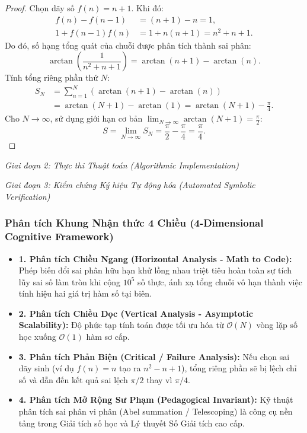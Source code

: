 \documentclass{article}
\begin{document}
\begin{proof}
Chọn dãy số $f(n) = n + 1$. Khi đó:
\begin{align}
    f(n) - f(n-1) &= (n + 1) - n = 1, \\
    1 + f(n-1) f(n) &= 1 + n(n + 1) = n^2 + n + 1.
\end{align}
Do đó, số hạng tổng quát của chuỗi được phân tích thành sai phân:
\begin{equation}
    \arctan\left(\frac{1}{n^2 + n + 1}\right) = \arctan(n + 1) - \arctan(n).
\end{equation}
Tính tổng riêng phần thứ $N$:
\begin{align}
    S_N &= \sum_{n=1}^N \left(\arctan(n + 1) - \arctan(n)\right) \nonumber \\
    &= \arctan(N + 1) - \arctan(1) = \arctan(N + 1) - \frac{\pi}{4}.
\end{align}
Cho $N \to \infty$, sử dụng giới hạn cơ bản $\lim_{N \to \infty} \arctan(N + 1) = \frac{\pi}{2}$:
\begin{equation}
    S = \lim_{N \to \infty} S_N = \frac{\pi}{2} - \frac{\pi}{4} = \frac{\pi}{4}.
\end{equation}
\end{proof}

\vspace{0.5em}\noindent\emph{Giai đoạn 2: Thực thi Thuật toán (Algorithmic Implementation)}


\vspace{0.5em}\noindent\emph{Giai đoạn 3: Kiểm chứng Ký hiệu Tự động hóa (Automated Symbolic Verification)}


\subsubsection*{Phân tích Khung Nhận thức 4 Chiều (4-Dimensional Cognitive Framework)}
\begin{itemize}
    \item \textbf{1. Phân tích Chiều Ngang (Horizontal Analysis - Math to Code):} Phép biến đổi sai phân hữu hạn khử lồng nhau triệt tiêu hoàn toàn sự tích lũy sai số làm tròn khi cộng $10^5$ số thực, ánh xạ tổng chuỗi vô hạn thành việc tính hiệu hai giá trị hàm số tại biên.
    \item \textbf{2. Phân tích Chiều Dọc (Vertical Analysis - Asymptotic Scalability):} Độ phức tạp tính toán được tối ưu hóa từ $\mathcal{O}(N)$ vòng lặp số học xuống $\mathcal{O}(1)$ hàm sơ cấp.
    \item \textbf{3. Phân tích Phản Biện (Critical / Failure Analysis):} Nếu chọn sai dãy sinh (ví dụ $f(n) = n$ tạo ra $n^2 - n + 1$), tổng riêng phần sẽ bị lệch chỉ số và dẫn đến kết quả sai lệch $\pi/2$ thay vì $\pi/4$.
    \item \textbf{4. Phân tích Mở Rộng Sư Phạm (Pedagogical Invariant):} Kỹ thuật phân tích sai phân vi phân (Abel summation / Telescoping) là công cụ nền tảng trong Giải tích số học và Lý thuyết Số Giải tích cao cấp.
\end{itemize}
\end{document}
